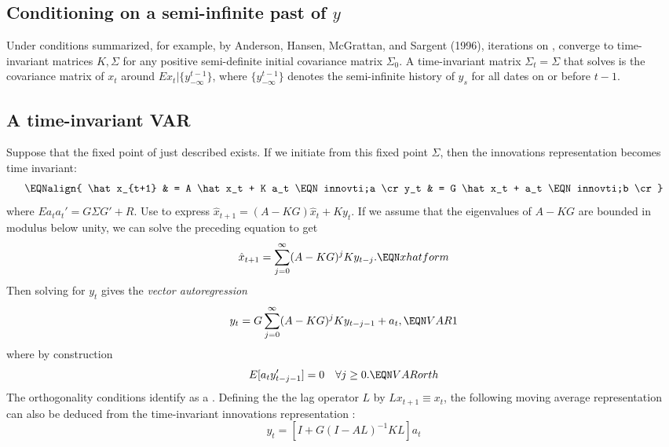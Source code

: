 \subsection{Conditioning on a semi-infinite past of $y$}
Under  conditions summarized, for example, by
Anderson, Hansen, McGrattan, and Sargent (1996), iterations on ,  converge to time-invariant matrices
$K, \Sigma$ for any positive semi-definite initial covariance matrix $\Sigma_0$.
A time-invariant matrix $\Sigma_t=\Sigma$ that solves  is the covariance matrix
of $x_t$ around $E x_t | \{y^{t-1}_{-\infty}\} $, where $\{y^{t-1}_{-\infty}\}$ denotes the semi-infinite
history of $y_s$ for all dates on or before $t-1$.
%

\subsection{A time-invariant VAR}
Suppose that  the fixed point of  just  described exists. If we initiate  from this fixed point $\Sigma$, then the  innovations representation
becomes time invariant:
$$\EQNalign{ \hat x_{t+1} & = A \hat x_t + K a_t \EQN innovti;a \cr
             y_t & = G \hat x_t + a_t \EQN innovti;b \cr} $$
where $E a_t a_t' = G \Sigma G' + R$.  Use  to express
$ \hat x_{t+1} = (A -KG) \hat x_t + K y_t$.  If we assume that
the eigenvalues of $A-KG$ are bounded in modulus below unity, we can
solve the preceding equation to get
$$\hat x_{t+1} = \sum_{j=0}^\infty  (A-KG)^j K y_{t-j}. \EQN xhatform $$
Then solving  for $y_t$ gives
the {\it vector autoregression\/}
$$ y_t = G \sum_{j=0}^\infty (A-KG)^j K y_{t-j-1} + a_t ,\EQN VAR1 $$
where by construction
$$ E[a_t y_{t-j-1}' ]= 0 \quad \forall j \geq 0 .\EQN VARorth $$
The orthogonality conditions  identify  as a . 
Defining the 
the lag operator $L$ by $L x_{t+1} \equiv x_t$,  
the following   moving average representation
can also be deduced from the time-invariant innovations representation 
:  
$$ y_t = [I + G (I - A L)^{-1} K L ] a_t $$

